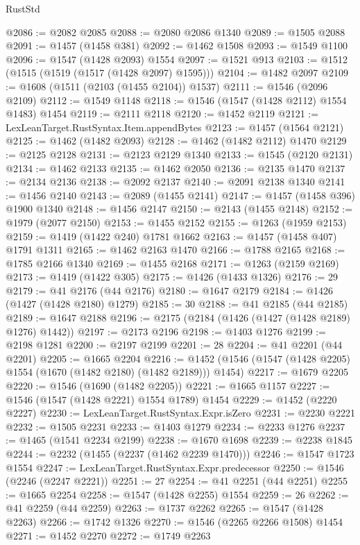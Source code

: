 \begin{lexlean}{RustStd}
\begin{coremodule}
@2086 := @2082 @2085
@2088 := @2080 @2086 @1340
@2089 := @1505 @2088
@2091 := @1457 (@1458 @381)
@2092 := @1462 @1508
@2093 := @1549 @1100
@2096 := @1547 (@1428 @2093) @1554
@2097 := @1521 @913
@2103 := @1512 (@1515 (@1519 (@1517 (@1428 @2097) @1595)))
@2104 := @1482 @2097
@2109 := @1608 (@1511 (@2103 (@1455 @2104)) @1537)
@2111 := @1546 (@2096 @2109)
@2112 := @1549 @1148
@2118 := @1546 (@1547 (@1428 @2112) @1554 @1483) @1454
@2119 := @2111 @2118
@2120 := @1452 @2119
@2121 := LexLeanTarget.RustSyntax.Item.appendBytes
@2123 := @1457 (@1564 @2121)
@2125 := @1462 (@1482 @2093)
@2128 := @1462 (@1482 @2112) @1470
@2129 := @2125 @2128
@2131 := @2123 @2129 @1340
@2133 := @1545 (@2120 @2131)
@2134 := @1462 @2133
@2135 := @1462 @2050
@2136 := @2135 @1470
@2137 := @2134 @2136
@2138 := @2092 @2137
@2140 := @2091 @2138 @1340
@2141 := @1456 @2140
@2143 := @2089 (@1455 @2141)
@2147 := @1457 (@1458 @396) @1900 @1340
@2148 := @1456 @2147
@2150 := @2143 (@1455 @2148)
@2152 := @1979 (@2077 @2150)
@2153 := @1455 @2152
@2155 := @1263 (@1959 @2153)
@2159 := @1419 (@1422 @240) @1781 @1662
@2163 := @1457 (@1458 @407) @1791 @1311
@2165 := @1462 @2163 @1470
@2166 := @1788 @2165
@2168 := @1785 @2166 @1340
@2169 := @1455 @2168
@2171 := @1263 (@2159 @2169)
@2173 := @1419 (@1422 @305)
@2175 := @1426 (@1433 @1326)
@2176 := 29
@2179 := @41 @2176 (@44 @2176)
@2180 := @1647 @2179
@2184 := @1426 (@1427 (@1428 @2180) @1279)
@2185 := 30
@2188 := @41 @2185 (@44 @2185)
@2189 := @1647 @2188
@2196 := @2175 (@2184 (@1426 (@1427 (@1428 @2189) @1276) @1442))
@2197 := @2173 @2196
@2198 := @1403 @1276
@2199 := @2198 @1281
@2200 := @2197 @2199
@2201 := 28
@2204 := @41 @2201 (@44 @2201)
@2205 := @1665 @2204
@2216 := @1452 (@1546 (@1547 (@1428 @2205) @1554 (@1670 (@1482 @2180) (@1482 @2189))) @1454)
@2217 := @1679 @2205
@2220 := @1546 (@1690 (@1482 @2205))
@2221 := @1665 @1157
@2227 := @1546 (@1547 (@1428 @2221) @1554 @1789) @1454
@2229 := @1452 (@2220 @2227)
@2230 := LexLeanTarget.RustSyntax.Expr.isZero
@2231 := @2230 @2221
@2232 := @1505 @2231
@2233 := @1403 @1279
@2234 := @2233 @1276
@2237 := @1465 (@1541 @2234 @2199)
@2238 := @1670 @1698
@2239 := @2238 @1845
@2244 := @2232 (@1455 (@2237 (@1462 @2239 @1470)))
@2246 := @1547 @1723 @1554
@2247 := LexLeanTarget.RustSyntax.Expr.predecessor
@2250 := @1546 (@2246 (@2247 @2221))
@2251 := 27
@2254 := @41 @2251 (@44 @2251)
@2255 := @1665 @2254
@2258 := @1547 (@1428 @2255) @1554
@2259 := 26
@2262 := @41 @2259 (@44 @2259)
@2263 := @1737 @2262
@2265 := @1547 (@1428 @2263)
@2266 := @1742 @1326
@2270 := @1546 (@2265 @2266 @1508) @1454
@2271 := @1452 @2270
@2272 := @1749 @2263

\end{coremodule}
\end{lexlean}
